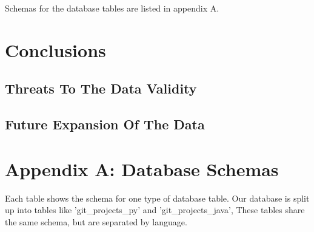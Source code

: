 \documentclass{article}
\begin{document}
Schemas for the database tables are listed in appendix A.


\section{Conclusions}
\subsection{Threats To The Data Validity}

\subsection{Future Expansion Of The Data}


\newpage




\newpage
\section{Appendix A: Database Schemas}
Each table shows the schema for one type of database table. Our database is split up into tables like 'git{\_}projects{\_}py' and 'git{\_}projects{\_}java', These tables share the same schema, but are separated by language.
\end{document}
